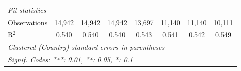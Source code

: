 \begin{tabular}{lccccccc}
   \midrule \emph{Fit statistics}\\
   Observations                                                                     & 14,942  & 14,942  & 14,942       & 13,697        & 11,140      & 11,140       & 10,111\\  
   R$^2$                                                                            & 0.540   & 0.540   & 0.540        & 0.543         & 0.541       & 0.542        & 0.549\\  
   \midrule
   \multicolumn{8}{l}{\emph{Clustered (Country) standard-errors in parentheses}}\\
   \multicolumn{8}{l}{\emph{Signif. Codes: ***: 0.01, **: 0.05, *: 0.1}}\\
\end{tabular}
\par\endgroup


